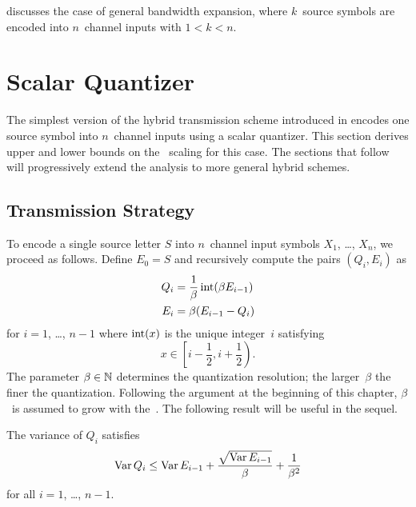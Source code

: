  discusses the case of general bandwidth expansion, where
$k$~source symbols are encoded into $n$~channel inputs with $1 < k < n$. 








\section{Scalar Quantizer}\label{sec:scalarquant}

The simplest version of the hybrid transmission scheme introduced in
 encodes one source symbol into $n$~channel inputs using a
scalar quantizer. This section derives upper and lower bounds on the \sdr\
scaling for this case. The sections that follow will progressively extend the
analysis to more general hybrid schemes.


\subsection{Transmission Strategy}\label{sec:commscheme}

To encode a single source letter $S$ into $n$~channel input symbols $X_1$,
\dots, $X_n$, we proceed as follows. Define $E_0 = S$ and recursively compute
the pairs $(Q_i, E_i)$ as
\begin{align}
  Q_i &= \frac{1}{\beta}\operatorname{int}(\beta E_{i-1}) \nonumber \\
  E_i &= \beta (E_{i-1} - Q_i) \label{eq:QEdef}
\end{align}
for $i = 1$, \dots, $n-1$ where $\operatorname{int}(x)$ is the unique integer~$i$ satisfying
\begin{equation*}
  x \in \left[i - \frac12, i +\frac12\right).
\end{equation*}
The parameter $\beta \in
{\mathbb{N}}$ determines the quantization resolution; the larger~$\beta$ the finer the
quantization. Following the argument at the beginning of this chapter,
$\beta$~is assumed to grow with the~\snr. The following result will be useful in
the sequel.

\begin{lemma}
  \label{lem:Qvarbound}
  The variance of $Q_i$ satisfies
  \begin{equation*}
    \operatorname{Var} Q_i \le \operatorname{Var} E_{i-1} + \frac{\sqrt{\operatorname{Var} E_{i-1}}}{\beta} +
    \frac{1}{\beta^2}
  \end{equation*}
  for all $i = 1$, \dots, $n-1$. 
\end{lemma}


